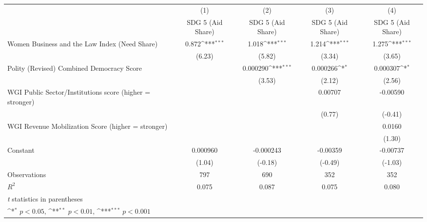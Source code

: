 {
\def\sym#1{\ifmmode^{#1}\else\(^{#1}\)\fi}
\begin{tabular}{l*{4}{c}}
\hline\hline
                &\multicolumn{1}{c}{(1)}&\multicolumn{1}{c}{(2)}&\multicolumn{1}{c}{(3)}&\multicolumn{1}{c}{(4)}\\
                &\multicolumn{1}{c}{SDG 5 (Aid Share)}&\multicolumn{1}{c}{SDG 5 (Aid Share)}&\multicolumn{1}{c}{SDG 5 (Aid Share)}&\multicolumn{1}{c}{SDG 5 (Aid Share)}\\
\hline
Women Business and the Law Index (Need Share)&    0.872\sym{***}&    1.018\sym{***}&    1.214\sym{***}&    1.275\sym{***}\\
                &   (6.23)         &   (5.82)         &   (3.34)         &   (3.65)         \\
[1em]
Polity (Revised) Combined Democracy Score&                  & 0.000290\sym{***}& 0.000266\sym{*}  & 0.000307\sym{*}  \\
                &                  &   (3.53)         &   (2.12)         &   (2.56)         \\
[1em]
WGI Public Sector/Institutions score (higher = stronger)&                  &                  &  0.00707         & -0.00590         \\
                &                  &                  &   (0.77)         &  (-0.41)         \\
[1em]
WGI Revenue Mobilization Score (higher = stronger)&                  &                  &                  &   0.0160         \\
                &                  &                  &                  &   (1.30)         \\
[1em]
Constant        & 0.000960         &-0.000243         & -0.00359         & -0.00737         \\
                &   (1.04)         &  (-0.18)         &  (-0.49)         &  (-1.03)         \\
\hline
Observations    &      797         &      690         &      352         &      352         \\
\(R^{2}\)       &    0.075         &    0.087         &    0.075         &    0.080         \\
\hline\hline
\multicolumn{5}{l}{\footnotesize \textit{t} statistics in parentheses}\\
\multicolumn{5}{l}{\footnotesize \sym{*} \(p<0.05\), \sym{**} \(p<0.01\), \sym{***} \(p<0.001\)}\\
\end{tabular}
}
